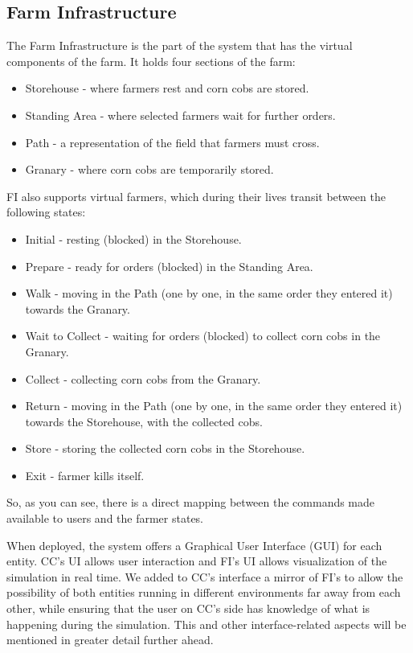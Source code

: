 \documentclass[12pt]{article}
\begin{document}
\subsection{Farm Infrastructure} %

The Farm Infrastructure is the part of the system that has the virtual components of the farm.
It holds four sections of the farm:
\vspace{-10pt}
\begin{itemize}[noitemsep]
  \item Storehouse - where farmers rest and corn cobs are stored.
  \item Standing Area - where selected farmers wait for further orders.
  \item Path - a representation of the field that farmers must cross.
  \item Granary - where corn cobs are temporarily stored.
\end{itemize}
\vspace{-10pt}
FI also supports virtual farmers, which during their lives transit between the following states:
\vspace{-10pt}
\begin{itemize}[noitemsep]
  \item Initial - resting (blocked) in the Storehouse.
  \item Prepare - ready for orders (blocked) in the Standing Area.
  \item Walk - moving in the Path (one by one, in the same order they entered it) towards the Granary.
  \item Wait to Collect - waiting for orders (blocked) to collect corn cobs in the Granary.
  \item Collect - collecting corn cobs from the Granary.
  \item Return - moving in the Path (one by one, in the same order they entered it) towards the Storehouse, with the collected cobs.
  \item Store - storing the collected corn cobs in the Storehouse.
  \item Exit - farmer kills itself.
\end{itemize}
\vspace{-10pt}
So, as you can see, there is a direct mapping between the commands made available to users and the farmer states.
\newline 

When deployed, the system offers a Graphical User Interface (GUI) for each entity.
CC's UI allows user interaction and FI's UI allows visualization of the simulation in real time.
We added to CC's interface a mirror of FI's to allow the possibility of both entities running in different environments far away from each other, while ensuring 
that the user on CC's side has knowledge of what is happening during the simulation.
This and other interface-related aspects will be mentioned in greater detail further ahead.
\end{document}
